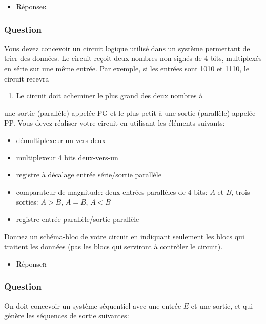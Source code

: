 \documentclass[11pt]{article}
\begin{document}
\begin{itemize}
\item Réponse\hfill{}\textsc{r}
\label{sec:org0477888}
\end{itemize}

\subsubsection*{Question}
\label{sec:orgca78d03}
Vous devez concevoir un circuit logique utilisé dans un système
permettant de trier des données. Le circuit reçoit deux nombres
non-signés de 4 bits, multiplexés en série sur une même entrée. Par
exemple, si les entrées sont 1010 et 1110, le circuit recevra
\begin{enumerate}
\item Le circuit doit acheminer le plus grand des deux nombres à
\end{enumerate}
une sortie (parallèle) appelée PG et le plus petit à une sortie
(parallèle) appelée PP. Vous devez réaliser votre circuit en utilisant
les éléments suivants:

\begin{itemize}
\item démultiplexeur un-vers-deux

\item multiplexeur 4 bits deux-vers-un

\item registre à décalage entrée série/sortie parallèle

\item comparateur de magnitude: deux entrées parallèles de 4 bits: \(A\) et
\(B\), trois sorties: \(A>B\), \(A=B\), \(A<B\)

\item registre entrée parallèle/sortie parallèle
\end{itemize}

Donnez un schéma-bloc de votre circuit en indiquant seulement les
blocs qui traitent les données (pas les blocs qui serviront à contrôler
le circuit).

\begin{itemize}
\item Réponse\hfill{}\textsc{r}
\label{sec:org102f937}
\end{itemize}

\subsubsection*{Question}
\label{sec:orgcca92a8}
On doit concevoir un système séquentiel avec une entrée \(E\) et une
sortie, et qui génère les séquences de sortie suivantes:
\end{document}
